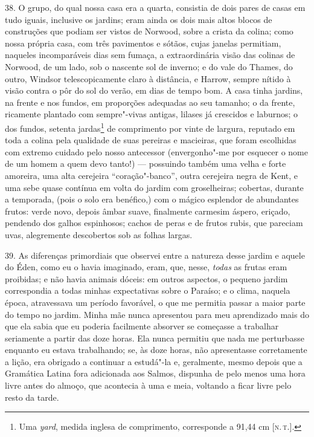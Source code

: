 38. O grupo, do qual nossa casa era a quarta, consistia de dois pares de
casas em tudo iguais, inclusive os jardins; eram ainda os dois mais
altos blocos de construções que podiam ser vistos de Norwood, sobre a
crista da colina; como nossa própria casa, com três pavimentos e sótãos,
cujas janelas permitiam, naqueles incomparáveis dias sem fumaça, a
extraordinária visão das colinas de Norwood, de um lado, sob o nascente
sol de inverno; e do vale do Thames, do outro, Windsor telescopicamente
claro à distância, e Harrow, sempre nítido à visão contra o pôr do sol
do verão, em dias de tempo bom. A casa tinha jardins, na frente e nos
fundos, em proporções adequadas ao seu tamanho; o da frente, ricamente
plantado com sempre"-vivas antigas, lilases já crescidos e laburnos; o
dos fundos, setenta jardas\footnote{Uma \emph{yard}, medida inglesa de
  comprimento, corresponde a 91,44 cm {[}\textsc{n.\,t.}{]}.} de comprimento
por vinte de largura, reputado em toda a colina pela qualidade de suas
pereiras e macieiras, que foram escolhidas com extremo cuidado pelo
nosso antecessor (envergonho"-me por esquecer o nome de um homem a quem
devo tanto!) --- possuindo também uma velha e forte amoreira, uma alta
cerejeira ``coração"-banco'', outra cerejeira negra de Kent, e uma sebe
quase contínua em volta do jardim com groselheiras; cobertas, durante a
temporada, (pois o solo era benéfico,) com o mágico esplendor de
abundantes frutos: verde novo, depois âmbar suave, finalmente carmesim
áspero, eriçado, pendendo dos galhos espinhosos; cachos de peras e de
frutos rubis, que pareciam uvas, alegremente descobertos sob as folhas
largas.

39. As diferenças primordiais que observei entre a natureza desse jardim
e aquele do Éden, como eu o havia imaginado, eram, que, nesse,
\emph{todas} as frutas eram proibidas; e não havia animais dóceis: em
outros aspectos, o pequeno jardim correspondia a todas minhas
expectativas sobre o Paraíso; e o clima, naquela época, atravessava um
período favorável, o que me permitia passar a maior parte do tempo no
jardim. Minha mãe nunca apresentou para meu aprendizado mais do que ela
sabia que eu poderia facilmente absorver se começasse a trabalhar
seriamente a partir das doze horas. Ela nunca permitiu que nada me
perturbasse enquanto eu estava trabalhando; se, às doze horas, não
apresentasse corretamente a lição, era obrigado a continuar a estudá"-la
e, geralmente, mesmo depois que a Gramática Latina fora adicionada aos
Salmos, dispunha de pelo menos uma hora livre antes do almoço, que
acontecia à uma e meia, voltando a ficar livre pelo resto da tarde.


